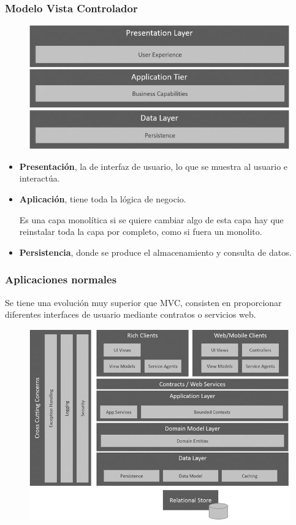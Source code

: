 \documentclass[12pt, twoside, openright]{report} %
\begin{document}
\subsubsection{Modelo Vista Controlador}
\begin{figure}[H]
	{\includegraphics[scale=.8]{9781484212769_Fig03-01.jpg}}
\end{figure}
\begin{itemize}
	\item \textbf{Presentación}, la de interfaz de usuario, lo que se muestra al usuario e interactúa.
	\item \textbf{Aplicación}, tiene toda la lógica de negocio.

	      Es una capa monolítica si se quiere cambiar algo de esta capa hay que reinstalar toda la capa por completo, como si fuera un monolito.

	\item \textbf{Persistencia}, donde se produce el almacenamiento y consulta de datos.
\end{itemize}
\pagebreak
\subsubsection{Aplicaciones normales}

Se tiene una evolución muy superior que MVC, consisten en proporcionar diferentes interfaces de usuario mediante contratos o servicios web.

\begin{figure}[H]
	{\includegraphics[scale=.8]{9781484212769_Fig03-02.jpg}}
\end{figure}
\end{document}
